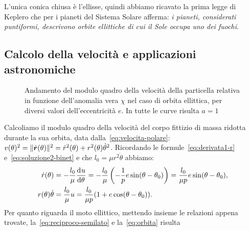 L'unica conica chiusa è l'ellisse, quindi abbiamo ricavato la prima legge di
Keplero che per i pianeti del Sistema Solare afferma: \emph{i pianeti,
  considerati puntiformi, descrivono orbite ellittiche di cui il Sole occupa uno
  dei fuochi}.

\subsection{Calcolo della velocità e applicazioni astronomiche}
\label{sec:velocita}
\begin{figure}
  \centering
  
  \caption[Andamento della velocità in funzione dell'anomalia vera]{Andamento
    del modulo quadro della velocità della particella relativa in funzione
    dell'anomalia vera $\chi$ nel caso di orbita ellittica, per diversi valori
    dell'eccentricità $e$. In tutte le curve risulta $a=1$}
  \label{fig:velocita}
\end{figure}
Calcoliamo il modulo quadro della velocità del corpo fittizio di massa ridotta
durante la sua orbita, data dalla~\eqref{eq:velocita-polare}: $v(\theta)^2 =
\lVert\dot{\bm{r}}(\theta)\rVert^2 = \dot{r}^2(\theta) +
r^2(\theta)\dot{\theta}^2$. Ricordando le formule~\eqref{eq:derivata1-r}
e~\eqref{eq:soluzione2-binet} e che $l_0=\mu r^2\dot{\theta}$ abbiamo:
\begin{subequations}
  \begin{align}
    \dot{r}(\theta) &= -\frac{l_0}{\mu}\frac{{\mathop{}\!\mathrm{d}^{}}u}{\mathop{}\!\mathrm{d} {\theta}^{}} = -\frac{l_0}{\mu}
    \left( -\frac{1}{p}e\sin(\theta-\theta_0) \right) = \frac{l_0}{\mu p}e
    \sin(\theta -
    \theta_0), \label{eq:velocita-radiale}\\
    r(\theta)\dot{\theta} &= \frac{l_0}{\mu}u =
    \frac{l_0}{\mu p}(1+e\cos(\theta-\theta_0)). \label{eq:velocita-tangenziale}
  \end{align}
\end{subequations}
Per quanto riguarda il moto ellittico, mettendo insieme le relazioni appena
trovate, la~\eqref{eq:reciproco-semilato} e la~\eqref{eq:orbita} risulta
